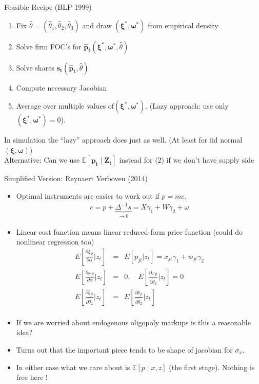 \begin{frame}{Feasible Recipe (BLP 1999)}
\begin{enumerate}
\item Fix $\widehat{\theta}=(\widehat{\theta}_1,\widehat{\theta}_2,\widehat{\theta}_3)$ and draw $(\boldsymbol{\xi}^{*},\boldsymbol{\omega}^{*})$ from empirical density
\item Solve firm FOC's for $\mathbf{\hat{p}_{t}}(\boldsymbol{\xi}^{*},\boldsymbol{\omega}^{*},\widehat{\theta})$
\item Solve shares $\mathbf{s_{t}}(\mathbf{\hat{p}_{t}},\widehat{\theta})$
\item Compute necessary Jacobian
\item Average over multiple values of$(\boldsymbol{\xi}^{*},\boldsymbol{\omega}^{*})$. (Lazy approach: use only $(\boldsymbol{\xi}^{*},\boldsymbol{\omega}^{*})=0$).
\end{enumerate}
In simulation the ``lazy'' approach does just as well. (At least for iid normal $(\boldsymbol{\xi},\boldsymbol{\omega})$)\\

 Alternative: Can we use $\mathbb{E}[ \mathbf{p_t} \mid \mathbf{Z_t}]$ instead for (2) if we don't have supply side
\end{frame}



\begin{frame}{Simplified Version: Reynaert Verboven (2014)}
\begin{itemize}
\footnotesize
\item Optimal instruments are easier to work out if $p = mc$.
\begin{eqnarray*}
c = p  + \underbrace{\Delta^{-1} s}_{\rightarrow 0}  = X \gamma_1 + W \gamma_2 + \omega
\end{eqnarray*}
\item Linear cost function means linear reduced-form price function (could do nonlinear regression too)
\begin{eqnarray*}
E\left[ \frac{\partial \xi_{jt} }{\partial \alpha} | z_t \right] &=& E[p_{jt} | z_t] = x_{jt} \gamma_1 + w_{jt} \gamma_2\\
E\left[ \frac{\partial \omega_{jt} }{\partial \alpha} | z_t \right] &=& 0 , \quad E\left[ \frac{\partial \omega_{jt} }{\partial \widetilde{\theta}_2} | z_t \right] = 0\\
E\left[ \frac{\partial \xi_{jt} }{\partial \widetilde{\theta}_2} | z_t \right] &=&E\left[ \frac{\partial \delta_{jt} }{\partial \widetilde{\theta}_2} | z_t \right]\\
\end{eqnarray*}
\item If we are worried about endogenous oligopoly markups is this a reasonable idea?
\item Turns out that the important piece tends to be \alert{shape} of jacobian for $\sigma_x$.
\item In either case what we care about is $\mathbb{E}[p \mid x, z]$ (the \alert{first stage}). Nothing is free here !
\end{itemize}
\end{frame}

